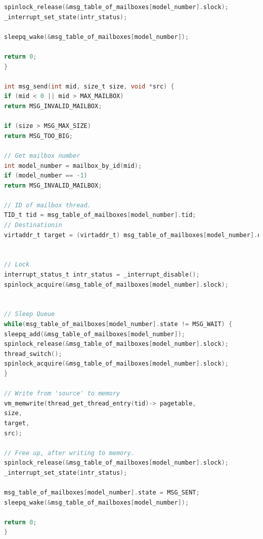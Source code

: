 \documentclass[11pt,a4paper]{article}
\theoremstyle{plain}
\theoremstyle{definition}
\theoremstyle{remark}
\numberwithin{equation}{section}
\begin{document}
\begin{lstlisting}[language=C,caption={msg.c},label={lst:msg_c}]
spinlock_release(&msg_table_of_mailboxes[model_number].slock);
_interrupt_set_state(intr_status);

sleepq_wake(&msg_table_of_mailboxes[model_number]);

return 0;
}

int msg_send(int mid, size_t size, void *src) {
if (mid < 0 || mid > MAX_MAILBOX)
return MSG_INVALID_MAILBOX;

if (size > MSG_MAX_SIZE)
return MSG_TOO_BIG;

// Get mailbox number
int model_number = mailbox_by_id(mid);
if (model_number == -1)
return MSG_INVALID_MAILBOX;

// ID of mailbox thread.
TID_t tid = msg_table_of_mailboxes[model_number].tid;
// Destinationin
virtaddr_t target = (virtaddr_t) msg_table_of_mailboxes[model_number].destination;


// Lock
interrupt_status_t intr_status = _interrupt_disable();
spinlock_acquire(&msg_table_of_mailboxes[model_number].slock);


// Sleep Queue
while(msg_table_of_mailboxes[model_number].state != MSG_WAIT) {
sleepq_add(&msg_table_of_mailboxes[model_number]);
spinlock_release(&msg_table_of_mailboxes[model_number].slock);
thread_switch();
spinlock_acquire(&msg_table_of_mailboxes[model_number].slock);
}

// Write from 'source' to memory
vm_memwrite(thread_get_thread_entry(tid)-> pagetable,
size,
target,
src);

// Free up, after writing to memory.
spinlock_release(&msg_table_of_mailboxes[model_number].slock);
_interrupt_set_state(intr_status);

msg_table_of_mailboxes[model_number].state = MSG_SENT;
sleepq_wake(&msg_table_of_mailboxes[model_number]);

return 0;
}
\end{lstlisting}
\end{document}
